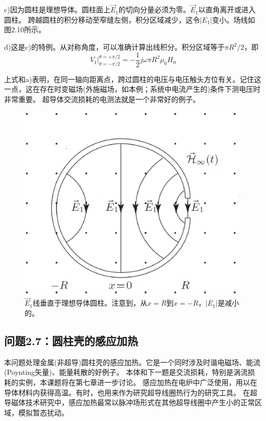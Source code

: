 c)因为圆柱是理想导体。圆柱面上$\vec{E}_1$的切向分量必须为零。$\vec{E}_1$以直角离开或进入圆柱。
跨越圆柱的积分移动至窄缝左侧，积分区域减少，这令$|E_1|$变小。场线如图2.10所示。

d)这是c)的特例。从对称角度，可以准确计算出线积分。积分区域等于$\pi R^2/2$，即
\begin{equation*}
V_1 |_{\theta=-\pi/2}^{\theta=+\pi/2}=-\frac{1}{2}j\omega \pi R^2 \mu_0 H_0   \tag{S6.3}
\end{equation*}

上式和a)表明，在同一轴向距离点，跨过圆柱的电压与电压触头方位有关。记住这一点，这在存在时变磁场(外施磁场，如本例；系统中电流产生的)条件下测电压时非常重要。
超导体交流损耗的电测法就是一个非常好的例子。

\begin{figure}[htbp]
  \centering
 \includegraphics[scale=0.4]{chpt2/figs/fig2.10.eps}
  \caption{$\vec{E}_1$线垂直于理想导体圆柱。注意到，从$x=R$到$x=-R$，$|E_1|$是减小的。}
\end{figure}




\subsection{问题2.7：圆柱壳的感应加热}
本问题处理金属(非超导)圆柱壳的感应加热。它是一个同时涉及时谐电磁场、能流(Poynting矢量)、能量耗散的好例子。
本体和下一题是交流损耗，特别是涡流损耗的实例，本课题将在第七章进一步讨论。
感应加热在电炉中广泛使用，用以在导体材料内获得高温。有时，也用来作为研究超导线圈热行为的研究工具。
在超导磁体技术研究中，感应加热最常以脉冲场形式在其他超导线圈中产生小的正常区域，模拟暂态扰动。

